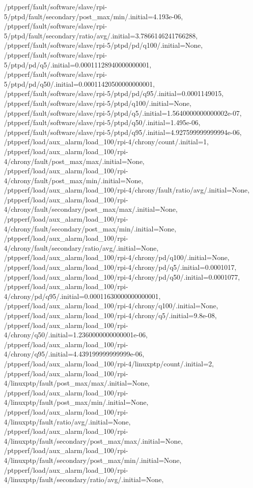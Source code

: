 {    /ptpperf/fault/software/slave/rpi-5/ptpd/fault/secondary/post_max/min/.initial=4.193e-06,
    /ptpperf/fault/software/slave/rpi-5/ptpd/fault/secondary/ratio/avg/.initial=3.7866146241766288,
    /ptpperf/fault/software/slave/rpi-5/ptpd/pd/q100/.initial=None,
    /ptpperf/fault/software/slave/rpi-5/ptpd/pd/q5/.initial=0.00011128940000000001,
    /ptpperf/fault/software/slave/rpi-5/ptpd/pd/q50/.initial=0.00011420500000000001,
    /ptpperf/fault/software/slave/rpi-5/ptpd/pd/q95/.initial=0.0001149015,
    /ptpperf/fault/software/slave/rpi-5/ptpd/q100/.initial=None,
    /ptpperf/fault/software/slave/rpi-5/ptpd/q5/.initial=1.5640000000000002e-07,
    /ptpperf/fault/software/slave/rpi-5/ptpd/q50/.initial=1.495e-06,
    /ptpperf/fault/software/slave/rpi-5/ptpd/q95/.initial=4.927599999999994e-06,
    /ptpperf/load/aux_alarm/load_100/rpi-4/chrony/count/.initial=1,
    /ptpperf/load/aux_alarm/load_100/rpi-4/chrony/fault/post_max/max/.initial=None,
    /ptpperf/load/aux_alarm/load_100/rpi-4/chrony/fault/post_max/min/.initial=None,
    /ptpperf/load/aux_alarm/load_100/rpi-4/chrony/fault/ratio/avg/.initial=None,
    /ptpperf/load/aux_alarm/load_100/rpi-4/chrony/fault/secondary/post_max/max/.initial=None,
    /ptpperf/load/aux_alarm/load_100/rpi-4/chrony/fault/secondary/post_max/min/.initial=None,
    /ptpperf/load/aux_alarm/load_100/rpi-4/chrony/fault/secondary/ratio/avg/.initial=None,
    /ptpperf/load/aux_alarm/load_100/rpi-4/chrony/pd/q100/.initial=None,
    /ptpperf/load/aux_alarm/load_100/rpi-4/chrony/pd/q5/.initial=0.0001017,
    /ptpperf/load/aux_alarm/load_100/rpi-4/chrony/pd/q50/.initial=0.0001077,
    /ptpperf/load/aux_alarm/load_100/rpi-4/chrony/pd/q95/.initial=0.00011630000000000001,
    /ptpperf/load/aux_alarm/load_100/rpi-4/chrony/q100/.initial=None,
    /ptpperf/load/aux_alarm/load_100/rpi-4/chrony/q5/.initial=9.8e-08,
    /ptpperf/load/aux_alarm/load_100/rpi-4/chrony/q50/.initial=1.2360000000000001e-06,
    /ptpperf/load/aux_alarm/load_100/rpi-4/chrony/q95/.initial=4.439199999999999e-06,
    /ptpperf/load/aux_alarm/load_100/rpi-4/linuxptp/count/.initial=2,
    /ptpperf/load/aux_alarm/load_100/rpi-4/linuxptp/fault/post_max/max/.initial=None,
    /ptpperf/load/aux_alarm/load_100/rpi-4/linuxptp/fault/post_max/min/.initial=None,
    /ptpperf/load/aux_alarm/load_100/rpi-4/linuxptp/fault/ratio/avg/.initial=None,
    /ptpperf/load/aux_alarm/load_100/rpi-4/linuxptp/fault/secondary/post_max/max/.initial=None,
    /ptpperf/load/aux_alarm/load_100/rpi-4/linuxptp/fault/secondary/post_max/min/.initial=None,
    /ptpperf/load/aux_alarm/load_100/rpi-4/linuxptp/fault/secondary/ratio/avg/.initial=None,
}
